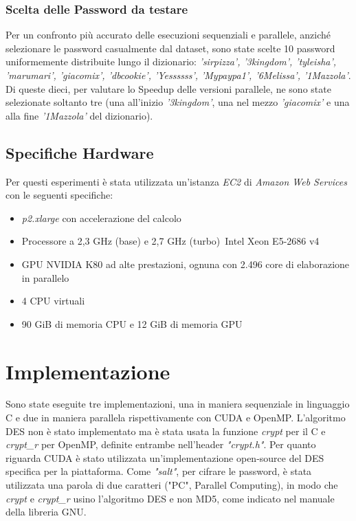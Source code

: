 \documentclass[10pt,twocolumn,letterpaper]{article}
\begin{document}
\subsubsection{Scelta delle Password da testare}
Per un confronto più accurato delle esecuzioni sequenziali e parallele, anziché selezionare le password casualmente dal dataset, sono state scelte 10 password uniformemente distribuite lungo il dizionario: \textit{'sirpizza', '3kingdom', 'tyleisha', 'marumari', 'giacomix', 'dbcookie', 'Yessssss', 'Mypaypa1', '6Melissa', '1Mazzola'}.\newline
Di queste dieci, per valutare lo Speedup delle versioni parallele, ne sono state selezionate soltanto tre (una all'inizio \textit{'3kingdom'}, una nel mezzo \textit{'giacomix'} e una alla fine \textit{'1Mazzola'} del dizionario).

\subsection{Specifiche Hardware}
Per questi esperimenti è stata utilizzata un'istanza \textit{EC2} di \textit{Amazon Web Services} con le seguenti specifiche:
\begin{itemize}
\item \textit{p2.xlarge} con accelerazione del calcolo
\item Processore a 2,3 GHz (base) e 2,7 GHz (turbo) Intel Xeon E5-2686 v4
\item GPU NVIDIA K80 ad alte prestazioni, ognuna con 2.496 core di elaborazione in parallelo
\item 4 CPU virtuali
\item 90 GiB di memoria CPU e 12 GiB di memoria GPU
\end{itemize} 

\section{Implementazione}
Sono state eseguite tre implementazioni, una in maniera sequenziale in linguaggio C e due in maniera parallela rispettivamente con CUDA e OpenMP.\newline
L'algoritmo DES non è stato implementato ma è stata usata la funzione \textit{crypt} per il C e \textit{crypt\_r} per OpenMP, definite entrambe nell'header \textit{"crypt.h"}. Per quanto riguarda CUDA è stato utilizzata un'implementazione open-source del DES specifica per la piattaforma. \cite{DES-CUDA}\newline
Come \textit{"salt"}, per cifrare le password, è stata utilizzata una parola di due caratteri ("PC", Parallel Computing), in modo che \textit{crypt} e \textit{crypt\_r} usino l'algoritmo DES e non MD5, come indicato nel manuale della libreria GNU. \cite{SALT}
\end{document}
